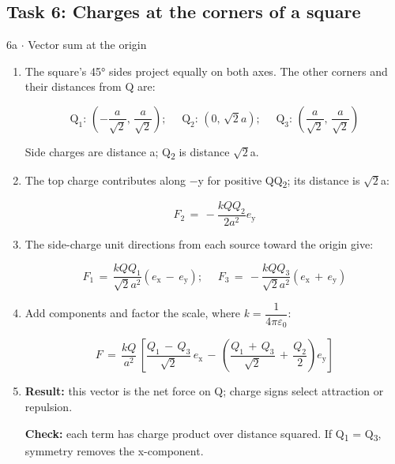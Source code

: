 \documentclass[11pt]{article}
\begin{document}
\begin{keepsection}\subsection{Task 6: Charges at the corners of a square}

\begin{workedbox}{6a \ensuremath{\cdot} Vector sum at the origin}
\begin{enumerate}
\item {}
The square’s 45° sides project equally on both axes. The other corners and their distances from Q are:

\begin{equation*}\mathrm{Q}_{1}:\, \left(-\dfrac{{a}}{\sqrt{2}},\, \dfrac{{a}}{\sqrt{2}}\right);\, \quad \, \mathrm{Q}_{2}:\, (0,\, \sqrt{2}{a});\, \quad \, \mathrm{Q}_{3}:\, \left(\dfrac{{a}}{\sqrt{2}},\, \dfrac{{a}}{\sqrt{2}}\right)\end{equation*}

Side charges are distance a; Q\textsubscript{2} is distance \ensuremath{\sqrt{2}}a.
\item {}
The top charge contributes along \ensuremath{-}y for positive QQ\textsubscript{2}; its distance is \ensuremath{\sqrt{2}}a:

\begin{equation*}{F}_{2}\, =\, -\dfrac{{kQQ}_{2}}{2{a}^{2}}{e}_{\mathrm{y}}\end{equation*}
\item {}
The side-charge unit directions from each source toward the origin give:

\begin{equation*}{F}_{1}\, =\, \dfrac{{kQQ}_{1}}{\sqrt{2}{a}^{2}}({e}_{\mathrm{x}}\, -\, {e}_{\mathrm{y}});\, \quad \, {F}_{3}\, =\, -\dfrac{{kQQ}_{3}}{\sqrt{2}{a}^{2}}({e}_{\mathrm{x}}\, +\, {e}_{\mathrm{y}})\end{equation*}
\item {}
Add components and factor the scale, where \textit{k} = {\small\ensuremath{\dfrac{1}{4π{ε}_{0}}}}:

\begin{equation*}{F}\, =\, \dfrac{{kQ}}{{a}^{2}}\, \left[\dfrac{{Q}_{1}\, -\, {Q}_{3}}{\sqrt{2}}\, {e}_{\mathrm{x}}\, -\, \left(\dfrac{{Q}_{1}\, +\, {Q}_{3}}{\sqrt{2}}\, +\, \dfrac{{Q}_{2}}{2}\right){e}_{\mathrm{y}}\right]\end{equation*}
\item {}
\textbf{Result:} this vector is the net force on Q; charge signs select attraction or repulsion.

\textbf{Check:} each term has charge product over distance squared. If Q\textsubscript{1} = Q\textsubscript{3}, symmetry removes the x-component.
\end{enumerate}
\end{workedbox}

\end{keepsection}
\end{document}
